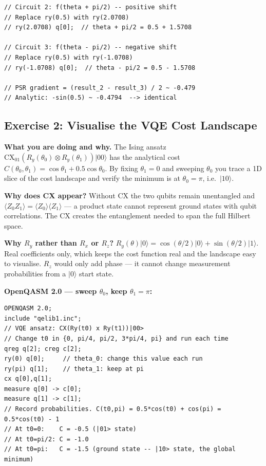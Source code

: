 \documentclass[a4paper,11pt]{article}
\newcommand{\ket}[1]{|#1\rangle}
\begin{document}
\begin{studentbox}
\begin{lstlisting}[language={}]
// Circuit 2: f(theta + pi/2) -- positive shift
// Replace ry(0.5) with ry(2.0708)
// ry(2.0708) q[0];  // theta + pi/2 = 0.5 + 1.5708

// Circuit 3: f(theta - pi/2) -- negative shift
// Replace ry(0.5) with ry(-1.0708)
// ry(-1.0708) q[0];  // theta - pi/2 = 0.5 - 1.5708

// PSR gradient = (result_2 - result_3) / 2 ~ -0.479
// Analytic: -sin(0.5) ~ -0.4794  --> identical
\end{lstlisting}
\end{studentbox}

\subsection{Exercise 2: Visualise the VQE Cost Landscape}

\begin{studentbox}
\textbf{What you are doing and why.} The Ising ansatz
$\mathrm{CX}_{01}(R_y(\theta_0)\otimes R_y(\theta_1))\ket{00}$
has the analytical cost $C(\theta_0,\theta_1) = \cos\theta_1 + 0.5\cos\theta_0$.
By fixing $\theta_1=0$ and sweeping $\theta_0$ you trace a 1D slice of the
cost landscape and verify the minimum is at $\theta_0=\pi$, i.e.\ $\ket{10}$.

\textbf{Why does CX appear?} Without CX the two qubits remain unentangled
and $\langle Z_0Z_1\rangle = \langle Z_0\rangle\langle Z_1\rangle$ — a product
state cannot represent ground states with qubit correlations.
The CX creates the entanglement needed to span the full Hilbert space.

\textbf{Why $R_y$ rather than $R_x$ or $R_z$?} $R_y(\theta)\ket{0} =
\cos(\theta/2)\ket{0} + \sin(\theta/2)\ket{1}$. Real coefficients only,
which keeps the cost function real and the landscape easy to visualise.
$R_z$ would only add phase — it cannot change measurement probabilities
from a $\ket{0}$ start state.

\medskip
\textbf{OpenQASM 2.0 — sweep $\theta_0$, keep $\theta_1 = \pi$:}
\begin{lstlisting}[language={}]
OPENQASM 2.0;
include "qelib1.inc";
// VQE ansatz: CX(Ry(t0) x Ry(t1))|00>
// Change t0 in {0, pi/4, pi/2, 3*pi/4, pi} and run each time
qreg q[2]; creg c[2];
ry(0) q[0];     // theta_0: change this value each run
ry(pi) q[1];    // theta_1: keep at pi
cx q[0],q[1];
measure q[0] -> c[0];
measure q[1] -> c[1];
// Record probabilities. C(t0,pi) = 0.5*cos(t0) + cos(pi) = 0.5*cos(t0) - 1
// At t0=0:    C = -0.5 (|01> state)
// At t0=pi/2: C = -1.0
// At t0=pi:   C = -1.5 (ground state -- |10> state, the global minimum)
\end{lstlisting}
\end{studentbox}
\end{document}
